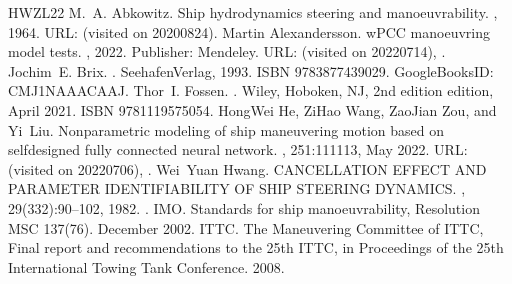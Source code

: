 \documentclass[review]{elsarticle}
\begin{document}
\begin{sphinxthebibliography}{HWZL22}
\sphinxAtStartPar
M. A. Abkowitz. Ship hydrodynamics \sphinxhyphen{} steering and manoeuvrability. , 1964. URL:  (visited on 2020\sphinxhyphen{}08\sphinxhyphen{}24).
\sphinxAtStartPar
Martin Alexandersson. wPCC manoeuvring model tests. , 2022. Publisher: Mendeley. URL:  (visited on 2022\sphinxhyphen{}07\sphinxhyphen{}14), .
\sphinxAtStartPar
Jochim E. Brix. . Seehafen\sphinxhyphen{}Verlag, 1993. ISBN 978\sphinxhyphen{}3\sphinxhyphen{}87743\sphinxhyphen{}902\sphinxhyphen{}9. Google\sphinxhyphen{}Books\sphinxhyphen{}ID: CMJ1NAAACAAJ.
\sphinxAtStartPar
Thor I. Fossen. . Wiley, Hoboken, NJ, 2nd edition edition, April 2021. ISBN 978\sphinxhyphen{}1\sphinxhyphen{}119\sphinxhyphen{}57505\sphinxhyphen{}4.
\sphinxAtStartPar
Hong\sphinxhyphen{}Wei He, Zi\sphinxhyphen{}Hao Wang, Zao\sphinxhyphen{}Jian Zou, and Yi Liu. Nonparametric modeling of ship maneuvering motion based on self\sphinxhyphen{}designed fully connected neural network. , 251:111113, May 2022. URL:  (visited on 2022\sphinxhyphen{}07\sphinxhyphen{}06), .
\sphinxAtStartPar
Wei Yuan Hwang. CANCELLATION EFFECT AND PARAMETER IDENTIFIABILITY OF SHIP STEERING DYNAMICS. , 29(332):90–102, 1982. .
\sphinxAtStartPar
IMO. Standards for ship manoeuvrability, Resolution MSC 137(76). December 2002.
\sphinxAtStartPar
ITTC. The Maneuvering Committee of ITTC, Final report and recommendations to the 25th ITTC, in Proceedings of the 25th International Towing Tank Conference. 2008.

\end{sphinxthebibliography}
\end{document}
